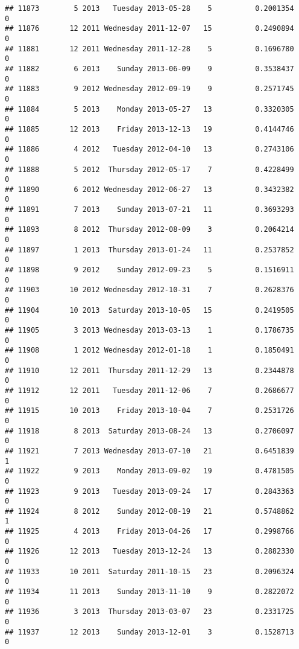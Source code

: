 \documentclass[
]{article}
\begin{document}
\begin{verbatim}
## 11873        5 2013   Tuesday 2013-05-28    5          0.2001354             0
## 11876       12 2011 Wednesday 2011-12-07   15          0.2490894             0
## 11881       12 2011 Wednesday 2011-12-28    5          0.1696780             0
## 11882        6 2013    Sunday 2013-06-09    9          0.3538437             0
## 11883        9 2012 Wednesday 2012-09-19    9          0.2571745             0
## 11884        5 2013    Monday 2013-05-27   13          0.3320305             0
## 11885       12 2013    Friday 2013-12-13   19          0.4144746             0
## 11886        4 2012   Tuesday 2012-04-10   13          0.2743106             0
## 11888        5 2012  Thursday 2012-05-17    7          0.4228499             0
## 11890        6 2012 Wednesday 2012-06-27   13          0.3432382             0
## 11891        7 2013    Sunday 2013-07-21   11          0.3693293             0
## 11893        8 2012  Thursday 2012-08-09    3          0.2064214             0
## 11897        1 2013  Thursday 2013-01-24   11          0.2537852             0
## 11898        9 2012    Sunday 2012-09-23    5          0.1516911             0
## 11903       10 2012 Wednesday 2012-10-31    7          0.2628376             0
## 11904       10 2013  Saturday 2013-10-05   15          0.2419505             0
## 11905        3 2013 Wednesday 2013-03-13    1          0.1786735             0
## 11908        1 2012 Wednesday 2012-01-18    1          0.1850491             0
## 11910       12 2011  Thursday 2011-12-29   13          0.2344878             0
## 11912       12 2011   Tuesday 2011-12-06    7          0.2686677             0
## 11915       10 2013    Friday 2013-10-04    7          0.2531726             0
## 11918        8 2013  Saturday 2013-08-24   13          0.2706097             0
## 11921        7 2013 Wednesday 2013-07-10   21          0.6451839             1
## 11922        9 2013    Monday 2013-09-02   19          0.4781505             0
## 11923        9 2013   Tuesday 2013-09-24   17          0.2843363             0
## 11924        8 2012    Sunday 2012-08-19   21          0.5748862             1
## 11925        4 2013    Friday 2013-04-26   17          0.2998766             0
## 11926       12 2013   Tuesday 2013-12-24   13          0.2882330             0
## 11933       10 2011  Saturday 2011-10-15   23          0.2096324             0
## 11934       11 2013    Sunday 2013-11-10    9          0.2822072             0
## 11936        3 2013  Thursday 2013-03-07   23          0.2331725             0
## 11937       12 2013    Sunday 2013-12-01    3          0.1528713             0

\end{verbatim}
\end{document}
